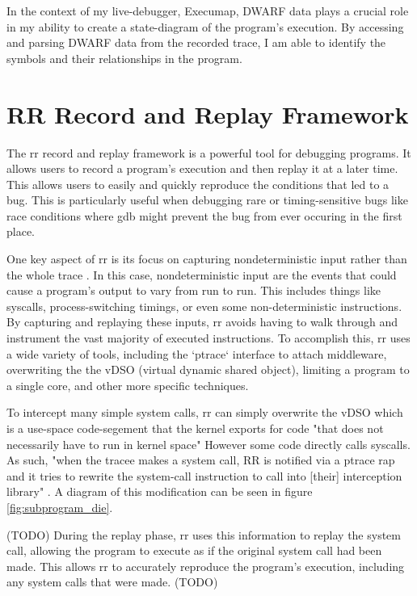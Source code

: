 In the context of my live-debugger, Execumap, DWARF data plays a crucial role in my ability to create a state-diagram of the program's execution. By accessing and parsing DWARF data from the recorded trace, I am able to identify the symbols and their relationships in the program.

\section{RR Record and Replay Framework}
The rr record and replay framework is a powerful tool for debugging programs. It allows users to record a program's execution and then replay it at a later time. This allows users to easily and quickly reproduce the conditions that led to a bug. This is particularly useful when debugging rare or timing-sensitive bugs like race conditions where gdb might prevent the bug from ever occuring in the first place.

One key aspect of rr is its focus on capturing nondeterministic input rather than the whole trace \cite{rr-site}. In this case, nondeterministic input are the events that could cause a program's output to vary from run to run. This includes things like syscalls, process-switching timings, or even some non-deterministic instructions. By capturing and replaying these inputs, rr avoids having to walk through and instrument the vast majority of executed instructions. To accomplish this, rr uses a wide variety of tools, including the `ptrace` interface to attach middleware, overwriting the the vDSO (virtual dynamic shared object), limiting a program to a single core, and other more specific techniques. 

To intercept many simple system calls, rr can simply overwrite the vDSO which is a use-space code-segement that the kernel exports for code "that does not necessarily have to run in kernel space" \cite{vdso} However some code directly calls syscalls. As such, "when the tracee makes a system call, RR is notified via a ptrace rap and it tries to rewrite the system-call instruction to call into [their] interception library" \cite[p.~8]{rr}. A diagram of this modification can be seen in figure \ref{fig:subprogram_die}. 

(TODO)
During the replay phase, rr uses this information to replay the system call, allowing the program to execute as if the original system call had been made. This allows rr to accurately reproduce the program's execution, including any system calls that were made. 
(TODO)

